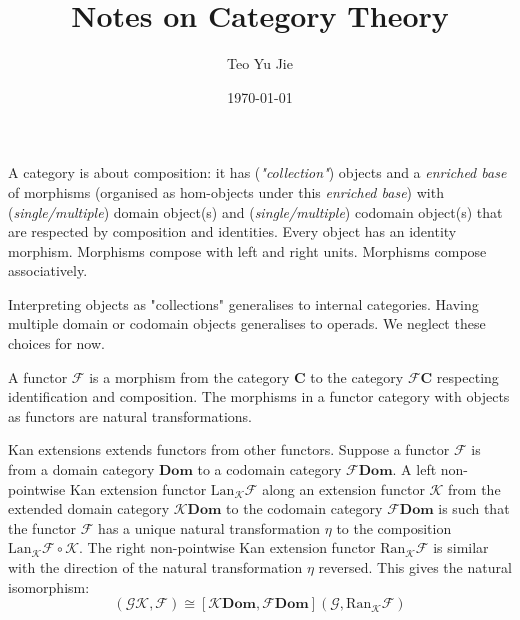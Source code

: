 \documentclass[10pt]{article}
\begin{document}
\title{Notes on Category Theory}

\author{Teo Yu Jie}

\date{\today}

\maketitle

A category is about composition: it has (\textit{"collection"}) objects and a \textit{enriched base} of morphisms (organised as hom-objects under this \textit{enriched base}) with (\textit{single/multiple}) domain object(s) and (\textit{single/multiple}) codomain object(s) that are respected by composition and identities. Every object has an identity morphism. Morphisms compose with left and right units. Morphisms compose associatively.


Interpreting objects as "collections" generalises to internal categories. Having multiple domain or codomain objects generalises to operads. We neglect these choices for now. 

A functor $\mathcal{F}$ is a morphism from the category $\mathbf{C}$ to the category $\mathcal{F}\mathbf{C}$ respecting identification and composition. The morphisms in a functor category with objects as functors are natural transformations.

Kan extensions extends functors from other functors. Suppose a functor $\mathcal{F}$ is from a domain category $\mathbf{Dom}$ to a codomain category $\mathcal{F} \mathbf{Dom}$. A left non-pointwise Kan extension functor $\mathrm{Lan}_\mathcal{K} \mathcal{F}$ along an extension functor $\mathcal{K}$ from the extended domain category $\mathcal{K} \mathbf{Dom}$ to the codomain category $\mathcal{F} \mathbf{Dom}$ is such that the functor $\mathcal{F}$ has a unique natural transformation $\eta$ to the composition $\mathrm{Lan}_\mathcal{K} \mathcal{F} \circ \mathcal{K}$. The right non-pointwise Kan extension functor $\mathrm{Ran}_\mathcal{K} \mathcal{F}$ is similar with the direction of the natural transformation $\eta$ reversed.
This gives the natural isomorphism:
\begin{equation}
    [\mathbf{Dom}, \mathcal{F} \mathbf{Dom}](\mathcal{G} \mathcal{K}, \mathcal{F}) \cong 
    [\mathcal{K} \mathbf{Dom}, \mathcal{F} \mathbf{Dom}](\mathcal{G}, \mathrm{Ran}_\mathcal{K} \mathcal{F})
\end{equation}
\end{document}
